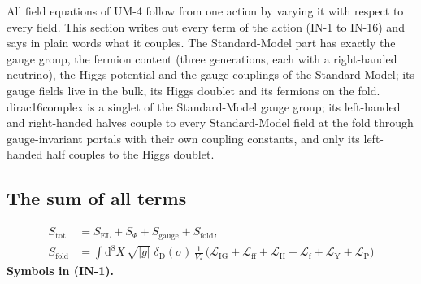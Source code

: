 \documentclass[
  10pt,
]{article}
\begin{document}
All field equations of UM-4 follow from one action by varying it with
respect to every field. This section writes out every term of the action
(IN-1 to IN-16) and says in plain words what it couples. The
Standard-Model part has exactly the gauge group, the fermion content
(three generations, each with a right-handed neutrino), the Higgs
potential and the gauge couplings of the Standard Model; its gauge
fields live in the bulk, its Higgs doublet and its fermions on the fold.
dirac16complex is a singlet of the Standard-Model gauge group; its
left-handed and right-handed halves couple to every Standard-Model field
at the fold through gauge-invariant portals with their own coupling
constants, and only its left-handed half couples to the Higgs doublet.

\hypertarget{the-sum-of-all-terms}{%
\subsection{The sum of all terms}\label{the-sum-of-all-terms}}

\[
\begin{aligned}
S_{\mathrm{tot}} &= S_{\mathrm{EL}} + S_\Psi + S_{\mathrm{gauge}} + S_{\mathrm{fold}},\\
S_{\mathrm{fold}} &= \int\mathrm{d}^8X\,\sqrt{\lvert g\rvert}\;\delta_{\mathrm{D}}(\sigma)\,\frac{1}{V_*}\,
\big(\mathcal{L}_{\mathrm{IG}} + \mathcal{L}_{\mathrm{ff}} + \mathcal{L}_{\mathrm{H}} + \mathcal{L}_{\mathrm{f}}
+ \mathcal{L}_{\mathrm{Y}} + \mathcal{L}_{\mathrm{P}}\big)
\end{aligned} \tag{IN-1}
\] \textbf{Symbols in (IN-1).}
\end{document}
